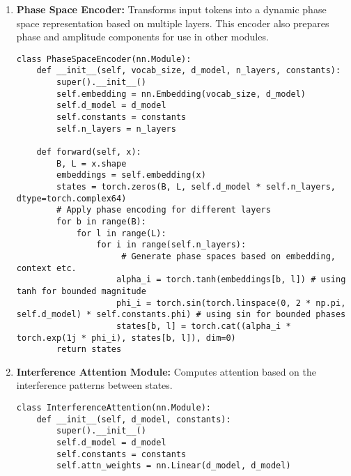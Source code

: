 \documentclass[11pt, a4paper]{article}
\begin{document}
\begin{enumerate}
    \item \textbf{Phase Space Encoder:} Transforms input tokens into a dynamic phase space representation based on multiple layers. This encoder also prepares phase and amplitude components for use in other modules.
        \begin{lstlisting}[caption=Phase Space Encoder Module]
class PhaseSpaceEncoder(nn.Module):
    def __init__(self, vocab_size, d_model, n_layers, constants):
        super().__init__()
        self.embedding = nn.Embedding(vocab_size, d_model)
        self.d_model = d_model
        self.constants = constants
        self.n_layers = n_layers

    def forward(self, x):
        B, L = x.shape
        embeddings = self.embedding(x)
        states = torch.zeros(B, L, self.d_model * self.n_layers, dtype=torch.complex64)
        # Apply phase encoding for different layers
        for b in range(B):
            for l in range(L):
                for i in range(self.n_layers):
                     # Generate phase spaces based on embedding, context etc.
                    alpha_i = torch.tanh(embeddings[b, l]) # using tanh for bounded magnitude
                    phi_i = torch.sin(torch.linspace(0, 2 * np.pi, self.d_model) * self.constants.phi) # using sin for bounded phases
                    states[b, l] = torch.cat((alpha_i * torch.exp(1j * phi_i), states[b, l]), dim=0)
        return states
        \end{lstlisting}

    \item \textbf{Interference Attention Module:} Computes attention based on the interference patterns between states.
        \begin{lstlisting}[caption=Interference Attention Module]
class InterferenceAttention(nn.Module):
    def __init__(self, d_model, constants):
        super().__init__()
        self.d_model = d_model
        self.constants = constants
        self.attn_weights = nn.Linear(d_model, d_model)


\end{lstlisting}
\end{enumerate}
\end{document}

